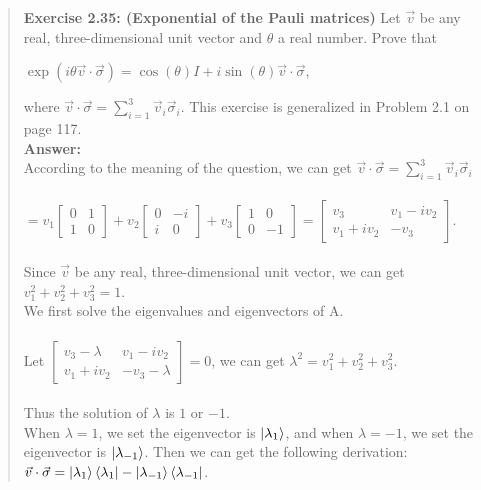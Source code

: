 \documentclass[UTF8]{ctexart}
\begin{document}
\begin{quote}
\textbf{Exercise 2.35: (Exponential of the Pauli matrices)} Let $ \vec{v}$ be any real, three-dimensional unit vector and $\theta$ a real number. Prove that 
\begin{center}
$\exp (i \theta \vec{v} \cdot \vec{\sigma})=\cos (\theta) I+i \sin (\theta) \vec{v} \cdot \vec{\sigma}$,
\end{center}
where $\vec{v} \cdot \vec{\sigma}=\sum_{i=1}^{3}\vec{v}_{i} \vec{\sigma}_{i}. $ This exercise is generalized in Problem 2.1 on page 117. 
\\
	\textbf{Answer:}\\
	According to the meaning of the question, we can get
 $\vec{v} \cdot \vec{\sigma}=\sum_{i=1}^{3}\vec{v}_{i} \vec{\sigma}_{i}$ \\ 
 \\
 $=v_{1}\begin{bmatrix}0& 1\\1& 0\end{bmatrix}+	
	v_{2}\begin{bmatrix}0& -i\\i&0\end{bmatrix}+
	v_{3}\begin{bmatrix}1& 0\\0&-1\end{bmatrix}
	=\begin{bmatrix}v_{3}& v_{1}-iv_{2}\\ v_{1}+iv_{2} &-v_{3}\end{bmatrix}$.
	\\ \\
	Since  $ \vec{v}$ be any real, three-dimensional unit vector, we can get $v_{1}^2+v_{2}^2+v_{3}^2=1$.\\
	We first solve the eigenvalues and eigenvectors of A. \\
	\\
	Let $\begin{bmatrix}v_{3}-\lambda& v_{1}-iv_{2}\\ v_{1}+iv_{2} &-v_{3}-\lambda \end{bmatrix}=0$, 
	we can get $\lambda^{2}=v_{1}^2+v_{2}^2+v_{3}^2$.\\
	\\
	Thus the solution of  $\lambda$ is $1$ or  $-1$. \\
	When $\lambda=1$, we set the eigenvector  is $\ket{\lambda_{1}}$, and when $\lambda=-1$, we set the eigenvector  is $\ket{\lambda_{-1}}$. Then we can get the following derivation: \\
	 $\vec{v} \cdot \vec{\sigma}=\ket{\lambda_{1}}\bra{\lambda_{1}}-\ket{\lambda_{-1}}\bra{\lambda_{-1}}$.

\end{quote}
\end{document}
